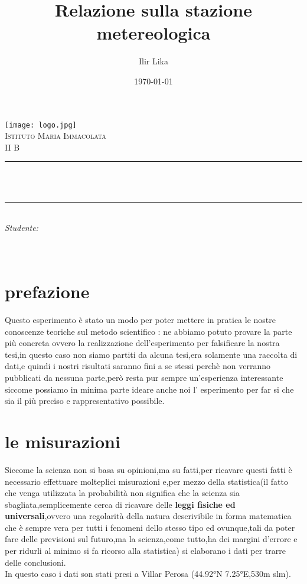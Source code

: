 \documentclass[12pt]{article}
\title{Relazione sulla stazione metereologica}
\author{Ilir Lika}
\date{\today}
\makeatletter
\let\thetitle\@title
\let\theauthor\@author
\let\thedate\@date
\makeatother
\begin{document}

\begin{titlepage}
	\centering
    \vspace*{0.5 cm}
    \texttt{[image: logo.jpg]}\\[1.0 cm]	
    \textsc{\LARGE Istituto Maria Immacolata}\\[2.0 cm]	
	\textsc{\Large II B}\\[0.5 cm]			
	\rule{\linewidth}{0.2 mm} \\[0.4 cm]
	{ \huge \bfseries \thetitle}\\
	\rule{\linewidth}{0.2 mm} \\[1.5 cm]
	
	
		
			\Large{\emph{Studente:}\\
			\theauthor}\\[2 cm]
		
	
	{\large \thedate}\\[2 cm]
 
	\vfill
	
\end{titlepage}


\tableofcontents
\pagebreak

\section{prefazione}
Questo esperimento è stato un modo per poter mettere in pratica le nostre conoscenze teoriche sul metodo scientifico : ne abbiamo potuto provare la parte più concreta ovvero la realizzazione dell'esperimento per falsificare la nostra tesi,in questo caso non siamo partiti da alcuna tesi,era solamente una raccolta di dati,e quindi i nostri risultati saranno fini a se stessi perchè non verranno pubblicati da nessuna parte,però resta pur sempre un'esperienza interessante siccome possiamo in minima parte ideare anche noi l' esperimento per far si che sia il più preciso e rappresentativo possibile.
\section{le misurazioni}
Siccome la scienza non si basa su opinioni,ma su fatti,per ricavare questi fatti è necessario effettuare molteplici misurazioni e,per mezzo della statistica(il fatto che venga utilizzata la probabilità non significa che la scienza sia sbagliata,semplicemente cerca di ricavare delle \textbf{leggi fisiche ed universali},ovvero una regolarità della natura descrivibile in forma matematica che è sempre vera per tutti i fenomeni dello stesso tipo ed ovunque,tali da poter fare delle previsioni sul futuro,ma la scienza,come tutto,ha dei margini d'errore e per ridurli al minimo si fa ricorso alla statistica) si elaborano i dati per trarre delle conclusioni.\\
In questo caso i dati son stati presi a Villar Perosa
(44.92°N 7.25°E,530m slm).
\end{document}
